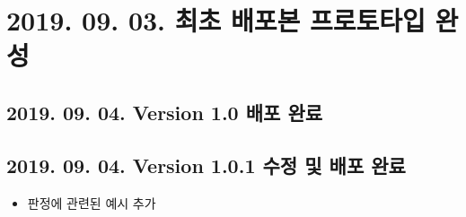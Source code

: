 \documentclass[12pt]{report}
\begin{document}
	\section*{2019. 09. 03. 최초 배포본 프로토타입 완성}
		\subsection*{2019. 09. 04. Version 1.0 배포 완료}
		
		\subsection*{2019. 09. 04. Version 1.0.1 수정 및 배포 완료}
		\begin{itemize}
			\item 판정에 관련된 예시 추가
		\end{itemize}
		
	
\end{document}
